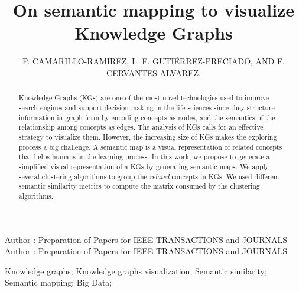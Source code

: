 \documentclass{ieeeaccess}
\begin{document}

\title{On semantic mapping to visualize Knowledge Graphs}
\author{\uppercase{P. Camarillo-Ramirez},
\uppercase{L. F. Guti\'{e}rrez-Preciado, and F. Cervantes-Alvarez}.}
\address[1]{Western Institute of Technology and Higher Education, Tlaquepaque, Jalisco 45601 Mexico (pablo.camarillo@iteso.mx;lgutierrez@iteso.mx;fcervantes@iteso.mx)}


\markboth
{Author \headeretal: Preparation of Papers for IEEE TRANSACTIONS and JOURNALS}
{Author \headeretal: Preparation of Papers for IEEE TRANSACTIONS and JOURNALS}


\graphicspath{ {img/} }

\begin{abstract}
Knowledge Graphs (KGs) are one of the most novel technologies used to
improve search engines and support
decision making in the life sciences since they structure information in graph form
by encoding concepts as nodes, and the semantics of the relationship
among concepts as edges. The analysis of KGs calls
for an effective strategy to visualize them. However, the increasing
size of KGs makes the exploring process a big challenge.
A semantic map is a visual representation of related concepts that helps humans
in the learning process. In this work, we propose to generate a simplified visual
representation of a KGs by generating semantic maps. We apply several clustering 
algorithms to group the \textit{related} concepts in KGs. We used different semantic similarity
metrics to compute the matrix consumed by the clustering algorithms.

\end{abstract}

\begin{keywords}
Knowledge graphs; Knowledge graphs visualization; Semantic similarity; Semantic mapping; Big Data;
\end{keywords}

\titlepgskip=-15pt

\maketitle
\end{document}
